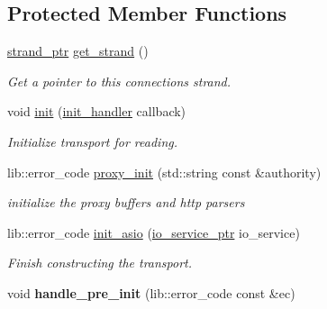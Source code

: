 \subsection*{Protected Member Functions}
\begin{DoxyCompactItemize}
\item 
\hyperlink{classwebsocketpp_1_1transport_1_1asio_1_1connection_a790e0c6b0cd50d26d7e803d4e274fe90}{strand\+\_\+ptr} \hyperlink{classwebsocketpp_1_1transport_1_1asio_1_1connection_a1d636545ad5cc7d78ddcff414fd55d0a}{get\+\_\+strand} ()\hypertarget{classwebsocketpp_1_1transport_1_1asio_1_1connection_a1d636545ad5cc7d78ddcff414fd55d0a}{}\label{classwebsocketpp_1_1transport_1_1asio_1_1connection_a1d636545ad5cc7d78ddcff414fd55d0a}

\begin{DoxyCompactList}\small\item\em Get a pointer to this connection\textquotesingle{}s strand. \end{DoxyCompactList}\item 
void \hyperlink{classwebsocketpp_1_1transport_1_1asio_1_1connection_ae09d85b808498f06bcc8d938c9107e8e}{init} (\hyperlink{namespacewebsocketpp_1_1transport_aeae75e675c1a334b3b33ab7120b480a5}{init\+\_\+handler} callback)
\begin{DoxyCompactList}\small\item\em Initialize transport for reading. \end{DoxyCompactList}\item 
lib\+::error\+\_\+code \hyperlink{classwebsocketpp_1_1transport_1_1asio_1_1connection_a2397c24d0ab9b344d70328788de721d4}{proxy\+\_\+init} (std\+::string const \&authority)
\begin{DoxyCompactList}\small\item\em initialize the proxy buffers and http parsers \end{DoxyCompactList}\item 
lib\+::error\+\_\+code \hyperlink{classwebsocketpp_1_1transport_1_1asio_1_1connection_a6432e2cbcb4e7781a6910dd7c9aa05e6}{init\+\_\+asio} (\hyperlink{classwebsocketpp_1_1transport_1_1asio_1_1connection_a0276cb30af3a21d73b585d07cf6170a1}{io\+\_\+service\+\_\+ptr} io\+\_\+service)
\begin{DoxyCompactList}\small\item\em Finish constructing the transport. \end{DoxyCompactList}\item 
void {\bfseries handle\+\_\+pre\+\_\+init} (lib\+::error\+\_\+code const \&ec)\hypertarget{classwebsocketpp_1_1transport_1_1asio_1_1connection_afbf08bd7b0fe30f9cdfaf0bce23f8172}{}\label{classwebsocketpp_1_1transport_1_1asio_1_1connection_afbf08bd7b0fe30f9cdfaf0bce23f8172}


\end{DoxyCompactItemize}
